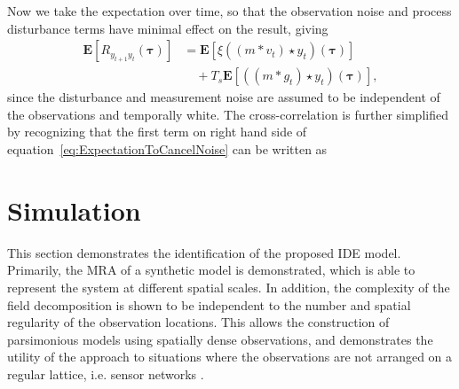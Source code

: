 \documentclass[draftcls,onecolumn]{IEEEtran}
\begin{document}
Now we take the expectation over time, so that the observation noise and process disturbance terms have minimal effect on the result, giving 
\begin{align}\label{eq:ExpectationToCancelNoise}
	\mathbf{E}[R_{y_{t+1}y_t}(\boldsymbol{\tau})] &= \mathbf{E}[\xi\left(\left(m \ast v_t\right) \star y_t \right)(\boldsymbol{\tau})] \nonumber \\
	 &\quad+ T_s \mathbf{E}[\left(\left(m\ast g_t\right)\star y_t \right)(\boldsymbol{\tau})],
\end{align}
since the disturbance and measurement noise are assumed to be independent of the observations and temporally white. 
The cross-correlation is further simplified by recognizing that the first term on right hand side of equation~\ref{eq:ExpectationToCancelNoise} can be written as



\section{Simulation}
This section demonstrates the identification of the proposed IDE model. Primarily, the MRA of a synthetic model is demonstrated, which is able to represent the system at different spatial scales. In addition, the complexity of the field decomposition is shown to be independent to the number and spatial regularity of the observation locations. This allows the construction of parsimonious models using spatially dense observations, and demonstrates the utility of the approach to situations where the observations are not arranged on a regular lattice, i.e. sensor networks \cite{Sahu2008}.
\end{document}
